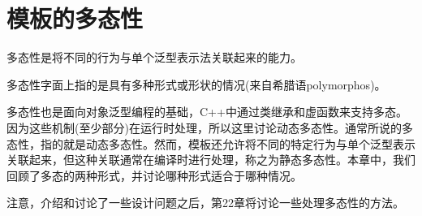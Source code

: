\chapter{模板的多态性}
多态性是将不同的行为与单个泛型表示法关联起来的能力。

\begin{notice}
多态性字面上指的是具有多种形式或形状的情况(来自希腊语polymorphos)。
\end{notice}

多态性也是面向对象泛型编程的基础，C++中通过类继承和虚函数来支持多态。因为这些机制(至少部分)在运行时处理，所以这里讨论动态多态性。通常所说的多态性，指的就是动态多态性。然而，模板还允许将不同的特定行为与单个泛型表示关联起来，但这种关联通常在编译时进行处理，称之为静态多态性。本章中，我们回顾了多态的两种形式，并讨论哪种形式适合于哪种情况。

注意，介绍和讨论了一些设计问题之后，第22章将讨论一些处理多态性的方法。






